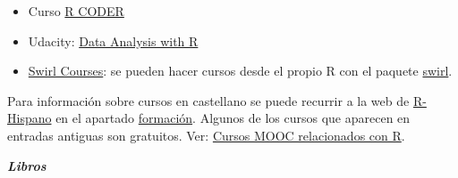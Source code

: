 \documentclass[
]{book}
\providecommand{\tightlist}{%
  \setlength{\itemsep}{0pt}\setlength{\parskip}{0pt}}
\theoremstyle{break}
\theoremstyle{definition}
\theoremstyle{definition}
\theoremstyle{definition}
\theoremstyle{remark}
\begin{document}
\begin{itemize}
\tightlist
\item
  Curso \href{https://r-coder.com/curso-r}{R CODER}
\end{itemize}

\begin{itemize}
\tightlist
\item
  Udacity: \href{https://eu.udacity.com/course/data-analysis-with-r--ud651}{Data Analysis with R}
\end{itemize}

\begin{itemize}
\tightlist
\item
  \href{https://swirlstats.com/scn/title.html}{Swirl Courses}:
  se pueden hacer cursos desde el propio R con el paquete
  \href{https://swirlstats.com}{swirl}.
\end{itemize}

Para información sobre cursos en castellano se puede recurrir a la web de \href{http://r-es.org/}{R-Hispano} en el apartado \href{http://r-es.org/category/formacion}{formación}. Algunos de los cursos que aparecen en entradas antiguas son gratuitos.
Ver: \href{http://r-es.org/2016/02/12/cursos-masivos-y-otra-formacion-on-line-sobre-r/}{Cursos MOOC relacionados con R}.

\textbf{\emph{Libros}}
\end{document}
